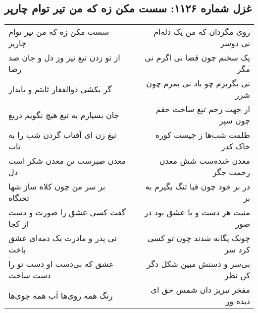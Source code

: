 \begin{center}
\section*{غزل شماره ۱۱۲۶: سست مکن زه که من تیر توام چارپر}
\label{sec:1126}
\begin{longtable}{l p{0.5cm} r}
سست مکن زه که من تیر توام چارپر
&&
روی مگردان که من یک دله‌ام نی دوسر
\\
از تو زدن تیغ تیز وز دل و جان صد رضا
&&
یک سخنم چون قضا نی اگرم نی مگر
\\
گر بکشی ذوالفقار ثابتم و پایدار
&&
نی بگریزم چو باد نی بمرم چون شرر
\\
جان بسپارم به تیغ هیچ نگویم دریغ
&&
از جهت زخم تیغ ساخت حقم چون سپر
\\
تیغ زن ای آفتاب گردن شب را به تاب
&&
ظلمت شب‌ها ز چیست کوره خاک کدر
\\
معدن صبرست تن معدن شکر است دل
&&
معدن خنده‌ست شش معدن رحمت جگر
\\
بر سر من چون کلاه ساز شها تختگاه
&&
در بر خود چون قبا تنگ بگیرم به بر
\\
گفت کسی عشق را صورت و دست از کجا
&&
منبت هر دست و پا عشق بود در صور
\\
نی پدر و مادرت یک دمه‌ای عشق باخت
&&
چونک یگانه شدند چون تو کسی کرد سر
\\
عشق که بی‌دست او دست تو را دست ساخت
&&
بی‌سر و دستش مبین شکل دگر کن نظر
\\
رنگ همه روی‌ها آب همه جوی‌ها
&&
مفخر تبریز دان شمس حق ای دیده ور
\\
\end{longtable}
\end{center}
